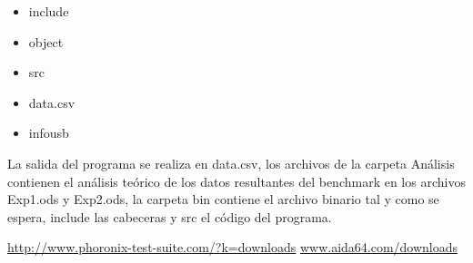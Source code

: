 \documentclass[a4paper, 10pt]{article} %
\begin{document}
\begin{itemize}
\begin{itemize}
\begin{itemize}
\begin{itemize}
\begin{description}
	\end{description}
\item include
\item object
\item src
\item data.csv
\item infousb
\end{itemize}
La salida del programa se realiza en data.csv, los archivos de la carpeta Análisis contienen el análisis teórico de los datos resultantes del benchmark en los archivos Exp1.ods y Exp2.ods, la carpeta bin contiene el archivo binario tal y como se espera, include las cabeceras y src el código del programa.
\end{itemize}   
\end{itemize}
\end{itemize}
\begin{thebibliography}{99}
 \url{http://www.phoronix-test-suite.com/?k=downloads}
 \url{www.aida64.com/downloads}
\end{thebibliography}
\end{document}
